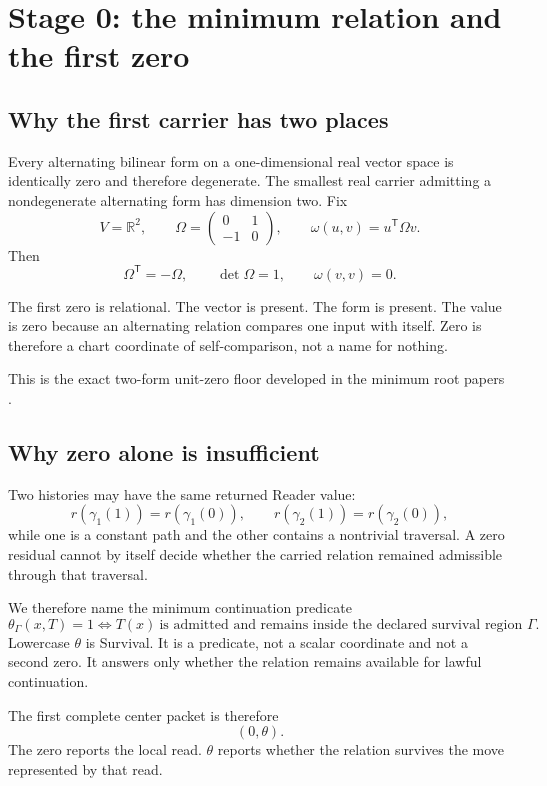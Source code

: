 \documentclass[11pt]{article}
\newcommand{\R}{\mathbb R}
\begin{document}
\section{Stage 0: the minimum relation and the first zero}

\subsection{Why the first carrier has two places}

Every alternating bilinear form on a one-dimensional real vector space is identically zero and therefore degenerate. The smallest real carrier admitting a nondegenerate alternating form has dimension two. Fix
\[
V=\R^2,
\qquad
\Omega=
\begin{pmatrix}
0&1\\-1&0
\end{pmatrix},
\qquad
\omega(u,v)=u^{\mathsf T}\Omega v.
\]
Then
\[
\Omega^{\mathsf T}=-\Omega,
\qquad
\det\Omega=1,
\qquad
\boxed{\omega(v,v)=0.}
\]

The first zero is relational. The vector is present. The form is present. The value is zero because an alternating relation compares one input with itself. Zero is therefore a chart coordinate of self-comparison, not a name for nothing.

This is the exact two-form unit-zero floor developed in the minimum root papers \cite{CoppaMinimumEndurance2026,CoppaGLMM2026}.

\subsection{Why zero alone is insufficient}

Two histories may have the same returned Reader value:
\[
r(\gamma_1(1))=r(\gamma_1(0)),
\qquad
r(\gamma_2(1))=r(\gamma_2(0)),
\]
while one is a constant path and the other contains a nontrivial traversal. A zero residual cannot by itself decide whether the carried relation remained admissible through that traversal.

We therefore name the minimum continuation predicate
\[
\boxed{
\theta_\Gamma(x,T)=1
\iff
T(x)\ \text{is admitted and remains inside the declared survival region }\Gamma.
}
\]
Lowercase $\theta$ is Survival. It is a predicate, not a scalar coordinate and not a second zero. It answers only whether the relation remains available for lawful continuation.

The first complete center packet is therefore
\[
\boxed{(0,\theta).}
\]
The zero reports the local read. $\theta$ reports whether the relation survives the move represented by that read.
\end{document}
